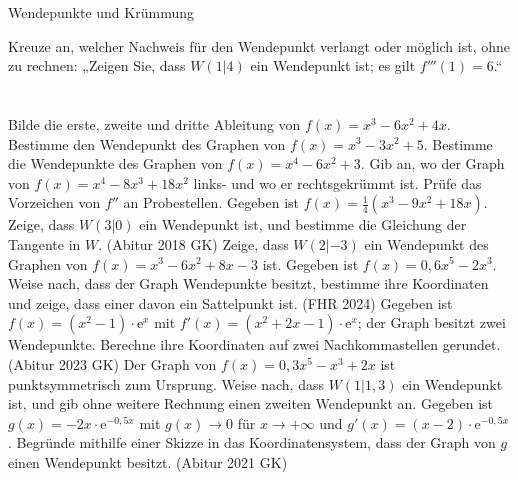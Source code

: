 \setcounter{aufgabe}{22}

\begin{aufgabe}{Wendepunkte und Krümmung}
\begin{teile}
\teil Kreuze an, welcher Nachweis für den Wendepunkt verlangt oder möglich ist, ohne zu rechnen: „Zeigen Sie, dass $W(1 | 4)$ ein Wendepunkt ist; es gilt $f'''(1) = 6$.“ \\  \\  \\ 
\teil Bilde die erste, zweite und dritte Ableitung von $f(x) = x^3 - 6x^2 + 4x$.
\teil Bestimme den Wendepunkt des Graphen von $f(x) = x^3 - 3x^2 + 5$.
\teil Bestimme die Wendepunkte des Graphen von $f(x) = x^4 - 6x^2 + 3$.
\teil Gib an, wo der Graph von $f(x) = x^4 - 8x^3 + 18x^2$ links- und wo er rechtsgekrümmt ist. Prüfe das Vorzeichen von $f''$ an Probestellen.
\teil Gegeben ist $f(x) = \frac{1}{4}(x^3 - 9x^2 + 18x)$. Zeige, dass $W(3 | 0)$ ein Wendepunkt ist, und bestimme die Gleichung der Tangente in $W$. \hfill (Abitur 2018 GK)
\teil Zeige, dass $W(2 | -3)$ ein Wendepunkt des Graphen von $f(x) = x^3 - 6x^2 + 8x - 3$ ist.
\teil Gegeben ist $f(x) = 0{,}6x^5 - 2x^3$. Weise nach, dass der Graph Wendepunkte besitzt, bestimme ihre Koordinaten und zeige, dass einer davon ein Sattelpunkt ist. \hfill (FHR 2024)
\teil Gegeben ist $f(x) = (x^2 - 1) \cdot \mathrm{e}^{x}$ mit $f'(x) = (x^2 + 2x - 1) \cdot \mathrm{e}^{x}$; der Graph besitzt zwei Wendepunkte. Berechne ihre Koordinaten auf zwei Nachkommastellen gerundet. \hfill (Abitur 2023 GK)
\teil Der Graph von $f(x) = 0{,}3x^5 - x^3 + 2x$ ist punktsymmetrisch zum Ursprung. Weise nach, dass $W(1 | 1{,}3)$ ein Wendepunkt ist, und gib ohne weitere Rechnung einen zweiten Wendepunkt an.
\teil Gegeben ist $g(x) = -2x \cdot \mathrm{e}^{-0{,}5x}$ mit $g(x) \to 0$ für $x \to +\infty$ und $g'(x) = (x - 2) \cdot \mathrm{e}^{-0{,}5x}$. Begründe mithilfe einer Skizze in das Koordinatensystem, dass der Graph von $g$ einen Wendepunkt besitzt. \hfill (Abitur 2021 GK)

\begin{ksys}[xmin=-1,xmax=10,ymin=-2,ymax=1] \end{ksys}
\end{teile}
\end{aufgabe}

